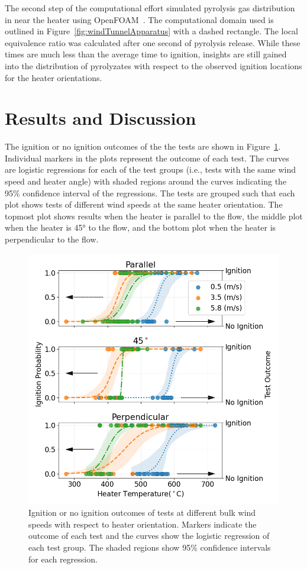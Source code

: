    The second step of the computational effort simulated pyrolysis gas distribution in near the heater using OpenFOAM~\cite{Foundation2020}. The computational domain used is outlined in Figure~\ref{fig:windTunnelApparatus} with a dashed rectangle. The local equivalence ratio was calculated after one second of pyrolysis release. While these times are much less than the average time to ignition, insights are still gained into the distribution of pyrolyzates with respect to the observed ignition locations for the heater orientations.
    
\section{Results and Discussion}
\label{sec:results2}
    The ignition or no ignition outcomes of the the tests are shown in Figure~\ref{fig:heaterAngle}. Individual markers in the plots represent the outcome of each test. The curves are logistic regressions for each of the test groups (i.e., tests with the same wind speed and heater angle) with shaded regions around the curves indicating the 95\% confidence interval of the regressions. The tests are grouped such that each plot shows tests of different wind speeds at the same heater orientation. The topmost plot shows results when the heater is parallel to the flow, the middle plot when the heater is 45\si{\degree} to the flow, and the bottom plot when the heater is perpendicular to the flow. 
        \begin{figure}[hpbt]
            \centering
            \includegraphics[width=0.5\columnwidth]{Figures/heat_angle_hist_names.png}
            \caption{Ignition or no ignition outcomes of tests at different bulk wind speeds with respect to heater orientation. Markers indicate the outcome of each test and the curves show the logistic regression of each test group. The shaded regions show 95\% confidence intervals for each regression.}
            \label{fig:heaterAngle}
        \end{figure}
